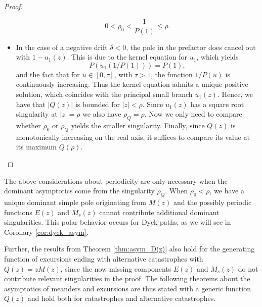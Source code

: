 \begin{proof}
\begin{itemize}
      $$
        0 < \rho_0 < \frac{1}{P(1)} \leq \rho.
      $$ 
    \item 
      In the case of a negative drift $\delta < 0$, the pole in the prefactor does cancel out with $1 - u_1(z)$.
      This is due to the kernel equation for $u_1$, which yields
      $$
      P\left(u_1\left(1/P(1)\right)\right) = P(1),
      $$
      and the fact that for $u \in [0,\tau]$, with $\tau > 1$, the function $1/P(u)$ is continuously increasing.
      Thus the kernel equation admits a unique positive solution, which coincides with the principal small branch $u_1(z)$.
      Hence, we have that $|Q(z)|$ is bounded for $|z| < \rho$.
      Since $u_1(z)$ has a square root singularity at $|z| = \rho$ we also have $\rho_Q = \rho$. Now we only need to compare whether $\rho_0$ or $\rho_Q$ yields the smaller singularity.
      Finally, since $Q(z)$ is monotonically increasing on the real axis, it suffices to compare its value at its maximum $Q(\rho)$. \qedhere
  \end{itemize}
\end{proof}

The above considerations about periodicity are only necessary when the dominant asymptotics come from the singularity $\rho_Q$.
When $\rho_0 < \rho$, we have a unique dominant simple pole originating from $M(z)$ and the possibly periodic functions $E(z)$ and $M_s(z)$ cannot contribute additional dominant singularities. 
This polar behavior occurs for Dyck paths, as we will see in Corollary \ref{cor:dyck_asym}.

Further, the results from Theorem \ref{thm:asym_D(z)} also hold for the generating function of excursions ending with alternative catastrophes with $Q(z) = zM(z)$, since the now missing components $E(z)$ and $M_s(z)$ do not contribute relevant singularities in the proof.
The following theorems about the asymptotics of meanders and excursions are thus stated with a generic function $Q(z)$ and hold both for catastrophes and alternative catastrophes.

